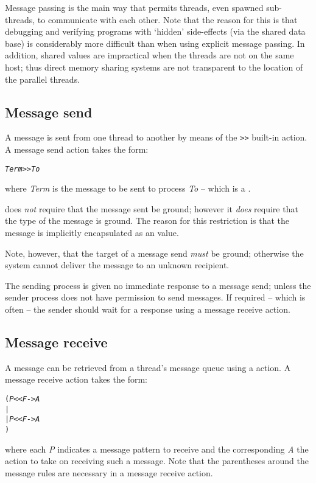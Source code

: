 Message passing is the main way that \go permits threads, even spawned sub-threads, to communicate with each other.  Note that the reason for this is that debugging and verifying programs with `hidden' side-effects (via the shared data base) is considerably more difficult than when using explicit message passing. In addition, shared values are impractical when the threads are not on the same host; thus direct memory sharing systems are not transparent to the location of the parallel threads.

\subsection{Message send}
\label{action:send}
A message is sent from one thread to another by means of the {\tt >>} built-in action. A message send action takes the form:
\begin{alltt}
\emph{Term} >> \emph{To}
\end{alltt}
where \emph{Term} is the message to be sent to process \emph{To} -- which is a .

\go does \emph{not} require that the message sent be ground; however it \emph{does} require that the type of the message is ground. The reason for this restriction is that the message is implicitly encapsulated as an  value.

Note, however, that the target of a message send \emph{must} be ground; otherwise the \go system cannot deliver the message to an unknown recipient.

The sending process is given no immediate response to a message send; unless the sender process does not have permission to send messages. If required -- which is often -- the sender should wait for a response using a message receive action. 

\subsection{Message receive}
\label{action:receive}

A message can be retrieved from a thread's message queue using
a  action. A message receive action takes the form:
\begin{alltt}
( \emph{P} << \emph{F} -> \emph{A}
| 
| \emph{P\subn} << \emph{F\subn} -> \emph{A\subn}
)
\end{alltt}
where each \emph{P\subi} indicates a message pattern to receive and the corresponding \emph{A} the action to take on receiving such a message. Note that the parentheses around the message rules are necessary in a message receive action.

